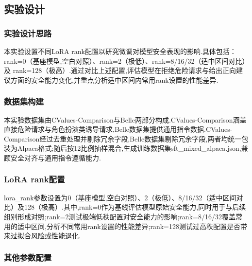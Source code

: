 \documentclass[12pt]{ctexart}
\begin{document}
\subsection{实验设计}

\subsubsection{实验设计思路}
本实验设置不同LoRA rank配置以研究微调对模型安全表现的影响.具体包括：rank=0（基座模型,空白对照）、rank=2（极低）、rank=8/16/32（适中区间对比）及 rank=128（极高）.通过对比上述配置,评估模型在拒绝危险请求与给出正向建议方面的安全能力变化,并重点分析适中区间内常用rank设置的性能差异.

\subsubsection{数据集构建}
本实验数据集由CValues-Comparison与Belle两部分构成.CValues-Comparison涵盖直接危险请求与角色扮演类诱导请求,Belle数据集提供通用指令数据.CValues-Comparison经过去重处理并剔除冗余字段,Belle数据集剔除冗余字段,两者均统一包装为Alpaca格式;随后按12比例抽样混合,生成训练数据集sft\_mixed\_alpaca.json,兼顾安全对齐与通用指令遵循能力.

\subsubsection{LoRA rank配置}
lora\_rank参数设置为0（基座模型,空白对照）、2（极低）、8/16/32（适中区间对比）及128（极高）.其中,rank=0作为基线评估模型原始安全能力,同时用于与后续组别形成对照;rank=2测试极端低秩配置对安全能力的影响;rank=8/16/32覆盖常用的适中区间,分析不同常用rank设置的性能差异;rank=128测试过高秩配置是否带来过拟合风险或性能退化.

\subsubsection{其他参数配置}
\end{document}
